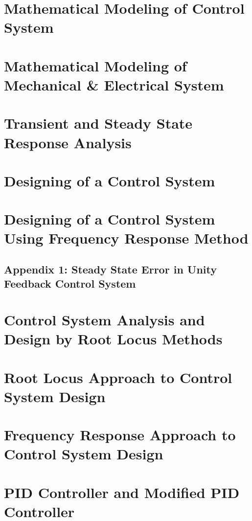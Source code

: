 \documentclass[11pt]{report}
\begin{document}
\tableofcontents



\chapter{Mathematical Modeling of Control System}


\chapter{Mathematical Modeling of Mechanical \& Electrical System}


\chapter{Transient and Steady State Response Analysis}


\chapter{Designing of a Control System}


\chapter{Designing of a Control System Using Frequency Response Method}


\section{Appendix 1: Steady State Error in Unity Feedback Control System}


\chapter{Control System Analysis and Design by Root Locus Methods}


\chapter{Root Locus Approach to Control System Design}


\chapter{Frequency Response Approach to Control System Design}


\chapter{PID Controller and Modified PID Controller}

\end{document}
